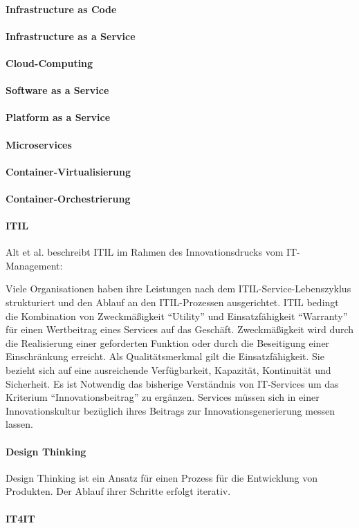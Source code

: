 \paragraph{Infrastructure as Code}

\paragraph{Infrastructure as a Service}

\paragraph{Cloud-Computing}

\paragraph{Software as a Service}

\paragraph{Platform as a Service}

\paragraph{Microservices}

\paragraph{Container-Virtualisierung}

\paragraph{Container-Orchestrierung}

\paragraph{ITIL}
Alt et al. beschreibt ITIL im Rahmen des Innovationsdrucks vom IT-Management:

Viele Organisationen haben ihre Leistungen nach dem ITIL-Service-Lebenszyklus strukturiert und den Ablauf an den ITIL-Prozessen ausgerichtet. ITIL bedingt die Kombination von Zweckmäßigkeit \enquote{Utility} und Einsatzfähigkeit \enquote{Warranty} für einen Wertbeitrag eines Services auf das Geschäft. Zweckmäßigkeit wird durch die Realisierung einer geforderten Funktion oder durch die Beseitigung einer Einschränkung erreicht. Als Qualitätsmerkmal gilt die Einsatzfähigkeit. Sie bezieht sich auf eine ausreichende Verfügbarkeit, Kapazität, Kontinuität und Sicherheit. Es ist Notwendig das bisherige Verständnis von IT-Services um das Kriterium \enquote{Innovationsbeitrag} zu ergänzen. Services müssen sich in einer Innovationskultur bezüglich ihres Beitrags zur Innovationsgenerierung messen lassen.

\cite{Alt2017}

\paragraph{Design Thinking}
Design Thinking ist ein Ansatz für einen Prozess für die Entwicklung von Produkten. Der Ablauf ihrer Schritte erfolgt iterativ. 

\paragraph{IT4IT}